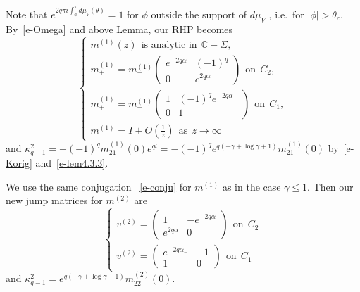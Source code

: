 \documentclass{amsart}
\theoremstyle{definition}
\theoremstyle{remark}
\numberwithin{equation}{section}
\newcommand{\C}{\mathbb C}
\begin{document}
Note that $e^{2q\pi i\int_{\phi}^{\pi} d\mu_V(\theta)}=1$ for $\phi$ 
outside the support of $d\mu_V$ , i.e.~for $|\phi|>\theta_c$. 
By~\eqref{e-Omega} and above Lemma, our RHP becomes 
\begin{equation}
\begin{cases}
m^{(1)}(z) \ \ \text{is analytic in} \ \ \C-\Sigma, \\
m^{(1)}_+=m^{(1)}_- \begin{pmatrix} e^{-2q\alpha}& (-1)^q\\ 0& e^{2q\alpha} \end{pmatrix} \ \ \text{on} \ \ C_2,\\
m^{(1)}_+=m^{(1)}_- \begin{pmatrix} 1& (-1)^qe^{-2q\alpha_-}\\ 0&1 \end{pmatrix} \ \ \text{on} \ \ C_1,\\
m^{(1)}=I+O(\frac1z) \ \ \text{as}\ \  z\rightarrow \infty
\end{cases}
\end{equation}
and $\kappa^2_{q-1}=-(-1)^qm^{(1)}_{21}(0)e^{ql}=
-(-1)^qe^{q(-\gamma+\log \gamma+1)}m^{(1)}_{21}(0)$
by~\eqref{e-Korig} and~\eqref{e-lem4.3.3}.

We use the same conjugation ~\eqref{e-conju} 
for $m^{(1)}$ as in the case $\gamma\le 1$.
Then our new jump matrices for $m^{(2)}$ are 
\begin{equation}\label{e-m2tilde}
\begin{cases}
v^{(2)}= \begin{pmatrix} 1& -e^{-2q\alpha}\\ e^{2q\alpha}&0 \end{pmatrix} \ \ \text{on} \ \ C_2\\
v^{(2)}= \begin{pmatrix} e^{-2q\alpha_-}& -1\\ 1&0 \end{pmatrix} \ \ \text{on} \ \ C_1
\end{cases}
\end{equation}
and $\kappa^2_{q-1}=e^{q(-\gamma+\log \gamma+1)}m^{(2)}_{22}(0)$.
\end{document}
